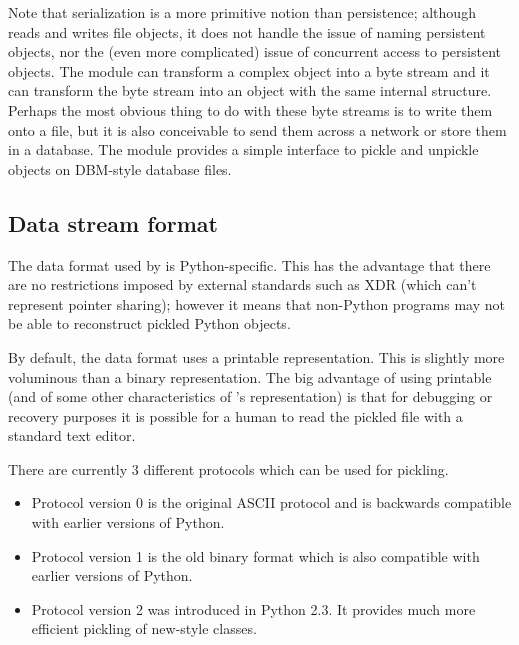 Note that serialization is a more primitive notion than persistence;
although
 reads and writes file objects, it does not handle the
issue of naming persistent objects, nor the (even more complicated)
issue of concurrent access to persistent objects.  The 
module can transform a complex object into a byte stream and it can
transform the byte stream into an object with the same internal
structure.  Perhaps the most obvious thing to do with these byte
streams is to write them onto a file, but it is also conceivable to
send them across a network or store them in a database.  The module
 provides a simple interface
to pickle and unpickle objects on DBM-style database files.

\subsection{Data stream format}

The data format used by  is Python-specific.  This has
the advantage that there are no restrictions imposed by external
standards such as XDR
(which can't represent pointer sharing); however it means that
non-Python programs may not be able to reconstruct pickled Python
objects.

By default, the  data format uses a printable \ASCII{}
representation.  This is slightly more voluminous than a binary
representation.  The big advantage of using printable \ASCII{} (and of
some other characteristics of 's representation) is that
for debugging or recovery purposes it is possible for a human to read
the pickled file with a standard text editor.

There are currently 3 different protocols which can be used for pickling.

\begin{itemize}

\item Protocol version 0 is the original ASCII protocol and is backwards
compatible with earlier versions of Python.

\item Protocol version 1 is the old binary format which is also compatible
with earlier versions of Python.

\item Protocol version 2 was introduced in Python 2.3.  It provides
much more efficient pickling of new-style classes.

\end{itemize}

